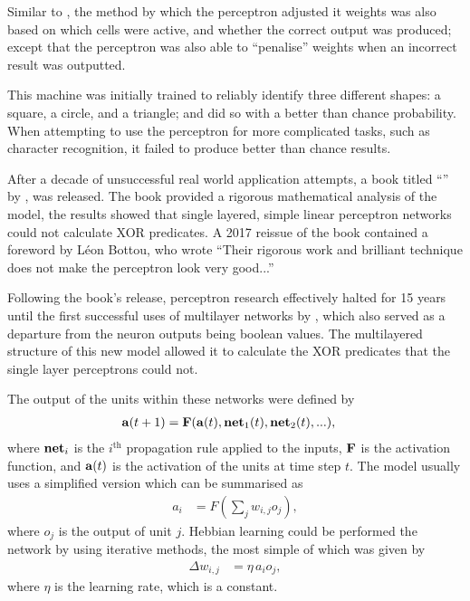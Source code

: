 Similar to \cite{Farley:1954:Simulation}, the method by which the perceptron
adjusted it weights was also based on which cells were active, and whether the
correct output was produced; except that the perceptron was also able to
``penalise'' weights when an incorrect result was outputted.

This machine was initially trained to reliably identify three different shapes:
a square, a circle, and a triangle; and did so with a better than chance
probability.
When attempting to use the perceptron for more complicated tasks, such as
character recognition, it failed to produce better than chance results.



After a decade of unsuccessful real world application attempts, a book titled
``'' by \cite{Minsky:1969:Perceptrons}, was
released.
The book provided a rigorous mathematical analysis of the model, the results
showed that single layered, simple linear perceptron networks could not
calculate XOR predicates.
A 2017 reissue of the book contained a foreword by L\'eon Bottou, who wrote
``Their rigorous work and brilliant technique does not make the perceptron look
very good...''



Following the book's release, perceptron research effectively halted for 15
years until the first successful uses of multilayer networks by
\cite{McClelland:1986:Parallel}, which also served as a departure from the
neuron outputs being boolean values.
The multilayered structure of this new model allowed it to calculate the XOR
predicates that the single layer perceptrons could not.

The output of the units within these networks were defined by
\begin{align*}
    \mathbf{a}(t+1) &= \mathbf{F}(\mathbf{a}(t),\mathbf{net}_1(t),\mathbf{net}_2(t),...),
\end{align*}
where $\mathbf{net}_i$ is the $i^\text{th}$ propagation rule applied to the
inputs, $\mathbf{F}$ is the activation function, and $\mathbf{a}(t)$ is the
activation of the units at time step $t$.
The model usually uses a simplified version which can be summarised as
\begin{align*}
    a_i &= F\left(\sum_j w_{i,j}o_j\right),
\end{align*}
where $o_j$ is the output of unit $j$.
Hebbian learning could be performed the network by using iterative methods,
the most simple of which was given by
\begin{align*}
    \Delta w_{i,j} &= \eta\,a_i o_j,
\end{align*}
where $\eta$ is the learning rate, which is a constant.

